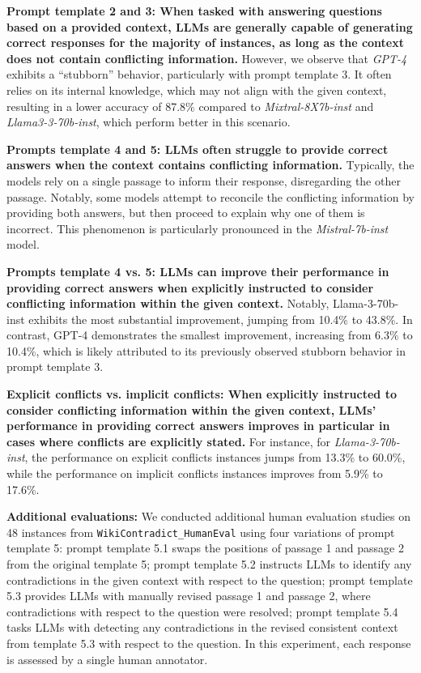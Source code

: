 \documentclass{article}
\begin{document}
\textbf{Prompt template 2 and 3: When tasked with answering questions based on a provided context, LLMs are generally capable of generating correct responses for the majority of instances, as long as the context does not contain conflicting information.} However, we observe that \emph{GPT-4} exhibits a ``stubborn'' behavior, particularly with prompt template 3. It often relies on its internal knowledge, which may not align with the given context, resulting in a lower accuracy of 87.8\% compared to \emph{Mixtral-8X7b-inst} and \emph{Llama3-3-70b-inst}, which perform better in this scenario.

\textbf{Prompts template 4 and 5: LLMs often struggle to provide correct answers when the context contains conflicting information.} Typically, the models rely on a single passage to inform their response, disregarding the other passage. Notably, some models attempt to reconcile the conflicting information by providing both answers, but then proceed to explain why one of them is incorrect. This phenomenon is particularly pronounced in the \emph{Mistral-7b-inst} model.

\textbf{Prompts template 4 vs. 5: LLMs can improve their performance in providing correct answers when explicitly instructed to consider conflicting information within the given context.} Notably, Llama-3-70b-inst exhibits the most substantial improvement, jumping from 10.4\% to 43.8\%. In contrast, GPT-4 demonstrates the smallest improvement, increasing from 6.3\% to 10.4\%, which is likely attributed to its previously observed stubborn behavior in prompt template 3.

\textbf{Explicit conflicts vs. implicit conflicts: When explicitly instructed to consider conflicting information within the given context, LLMs' performance in providing correct answers improves in particular %
in cases where conflicts are explicitly stated.} For instance, for \emph{Llama-3-70b-inst}, the performance on explicit conflicts instances jumps from 13.3\% to 60.0\%, while the performance on implicit conflicts instances improves from 5.9\% to 17.6\%.

\textbf{Additional evaluations: }We conducted additional human evaluation studies on 48 instances from \texttt{WikiContradict\_HumanEval} using four variations of prompt template 5: prompt template 5.1 swaps the positions of passage 1 and passage 2 from the original template 5; prompt template 5.2 instructs LLMs to identify any contradictions in the given context with respect to the question; prompt template 5.3 provides LLMs with manually revised passage 1 and passage 2, where contradictions with respect to the question were resolved; prompt template 5.4 tasks LLMs with detecting any contradictions in the revised consistent context from template 5.3 with respect to the question. In this experiment, each response is assessed by a single human annotator.
\end{document}

